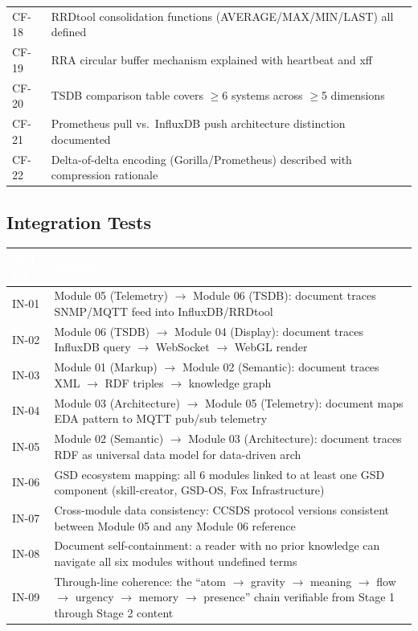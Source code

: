 \documentclass[11pt,letterpaper]{article}
\newcommand{\tableheader}[1]{\textbf{\sffamily\textcolor{white}{#1}}}
\begin{document}
\begin{center}
\begin{tabularx}{\textwidth}{L{1.5cm}X}
CF-18 & RRDtool consolidation functions (AVERAGE/MAX/MIN/LAST) all defined \\
CF-19 & RRA circular buffer mechanism explained with heartbeat and xff \\
CF-20 & TSDB comparison table covers $\geq$6 systems across $\geq$5 dimensions \\
CF-21 & Prometheus pull vs.\ InfluxDB push architecture distinction documented \\
CF-22 & Delta-of-delta encoding (Gorilla/Prometheus) described with compression rationale \\
\bottomrule
\end{tabularx}
\end{center}

\subsection{Integration Tests}

\begin{center}
\begin{tabularx}{\textwidth}{L{1.5cm}X}
\toprule
{}
\tableheader{Test ID} & \tableheader{Verifies} \\
\midrule
IN-01 & Module 05 (Telemetry) $\rightarrow$ Module 06 (TSDB): document traces SNMP/MQTT feed into InfluxDB/RRDtool \\
IN-02 & Module 06 (TSDB) $\rightarrow$ Module 04 (Display): document traces InfluxDB query $\rightarrow$ WebSocket $\rightarrow$ WebGL render \\
IN-03 & Module 01 (Markup) $\rightarrow$ Module 02 (Semantic): document traces XML $\rightarrow$ RDF triples $\rightarrow$ knowledge graph \\
IN-04 & Module 03 (Architecture) $\rightarrow$ Module 05 (Telemetry): document maps EDA pattern to MQTT pub/sub telemetry \\
IN-05 & Module 02 (Semantic) $\rightarrow$ Module 03 (Architecture): document traces RDF as universal data model for data-driven arch \\
IN-06 & GSD ecosystem mapping: all 6 modules linked to at least one GSD component (skill-creator, GSD-OS, Fox Infrastructure) \\
IN-07 & Cross-module data consistency: CCSDS protocol versions consistent between Module 05 and any Module 06 reference \\
IN-08 & Document self-containment: a reader with no prior knowledge can navigate all six modules without undefined terms \\
IN-09 & Through-line coherence: the ``atom $\rightarrow$ gravity $\rightarrow$ meaning $\rightarrow$ flow $\rightarrow$ urgency $\rightarrow$ memory $\rightarrow$ presence'' chain verifiable from Stage 1 through Stage 2 content \\
\bottomrule
\end{tabularx}
\end{center}
\end{document}
